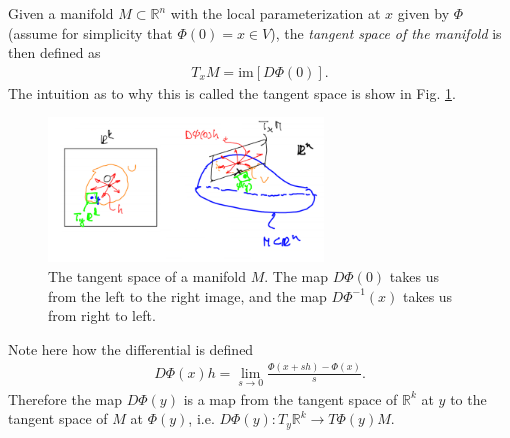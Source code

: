 \begin{definition}
	Given a manifold $M\subset \mathbb{R}^{n}$ with the local parameterization at $x$ given by $\Phi$ (assume for simplicity that $\Phi(0)=x\in V$), the \emph{tangent space of the manifold} is then defined as
	\begin{align}
		\boxed{
			T_{x}M= \textrm{im} [D\Phi(0)].
		}
	\end{align}
	The intuition as to why this is called the tangent space is show in Fig. \ref{fig:tangent_space_def}.
	\begin{figure}[h!]
		\centering
		\includegraphics[width=0.65\textwidth]{figures/ch9/6tangent_space_def.png}
		\caption{The tangent space of a manifold $M$. The map $D\Phi(0)$ takes us from the left to the right image, and the map $D\Phi^{-1}(x)$ takes us from right to left.}
		\label{fig:tangent_space_def}
	\end{figure}
\end{definition}

Note here how the differential is defined
\begin{align}
	D \Phi(x)h = \lim_{s \to 0} \frac{\Phi(x + sh) - \Phi(x)}{s}.
\end{align}
Therefore the map $D\Phi(y)$ is a map from the tangent space of $\mathbb{R}^{k}$ at $y$ to the tangent space of $M$ at $\Phi(y)$, i.e. $D\Phi(y): T_{y}\mathbb{R}^{k}\to T\Phi(y)M$. 

